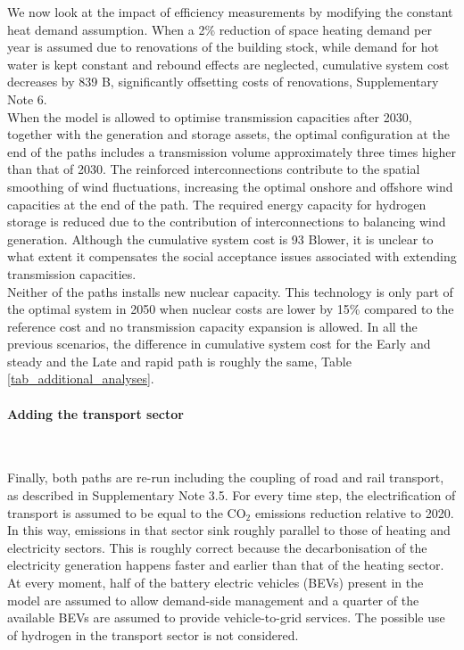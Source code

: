 \documentclass[5p]{elsarticle} %
\begin{document}
We now look at the impact of efficiency measurements by modifying the constant heat demand assumption. When a 2\% reduction of space heating demand per year is assumed due to renovations of the building stock, while demand for hot water is kept constant and rebound effects are neglected, cumulative system cost decreases by 839 B\EUR, significantly offsetting costs of renovations, Supplementary Note 6. \\


When the model is allowed to optimise transmission capacities after 2030, together with the generation and storage assets, the optimal configuration at the end of the paths includes a transmission volume approximately three times higher than that of 2030. The reinforced interconnections contribute to the spatial smoothing of wind fluctuations, increasing the optimal onshore and offshore wind capacities at the end of the path. The required energy capacity for hydrogen storage is reduced due to the contribution of interconnections to balancing wind generation. Although the cumulative system cost is 93 B\EUR lower, it is unclear to what extent it compensates the social acceptance issues associated with extending transmission capacities. \\

Neither of the paths installs new nuclear capacity. This technology is only part of the optimal system in 2050 when nuclear costs are lower by 15\% compared to the reference cost and no transmission capacity expansion is allowed. In all the previous scenarios, the difference in cumulative system cost for the Early and steady and the Late and rapid path is roughly the same, Table \ref{tab_additional_analyses}.


\paragraph{\textbf{Adding the transport sector}} \

Finally, both paths are re-run including the coupling of road and rail transport, as described in Supplementary Note 3.5. For every time step, the electrification of transport is assumed to be equal to the CO$_2$ emissions reduction relative to 2020. In this way, emissions in that sector sink roughly parallel to those of heating and electricity sectors. This is roughly correct because the decarbonisation of the electricity generation happens faster and earlier than that of the heating sector. At every moment, half of the battery electric vehicles (BEVs) present in the model are assumed to allow demand-side management and a quarter of the available BEVs are assumed to provide vehicle-to-grid services. The possible use of hydrogen in the transport sector is not considered.\\
\end{document}
